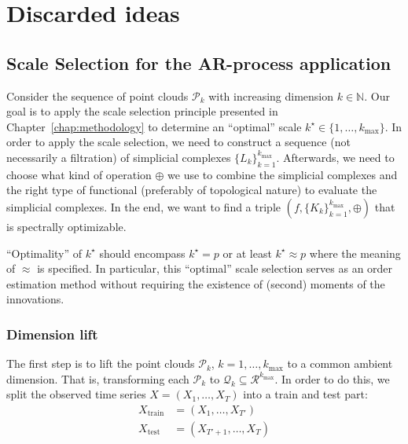 \chapter{Discarded ideas}

\section*{Scale Selection for the AR-process application}

Consider the sequence of point clouds $\mathcal{P}_k$ with increasing dimension $k\in\mathbb{N}$. Our goal is to apply the scale selection principle presented in Chapter~\ref{chap:methodology} to determine an \enquote{optimal} scale $k^{\star}\in\{1,\dots,k_{\max}\}$. In order to apply the scale selection, we need to construct a sequence (not necessarily a filtration) of simplicial complexes $\{L_k\}_{k=1}^{k_{\max}}$. Afterwards, we need to choose what kind of operation $\oplus$ we use to combine the simplicial complexes and the right type of functional (preferably of topological nature) to evaluate the simplicial complexes. In the end, we want to find a triple $(f,\{K_k\}_{k=1}^{k_{\max}},\oplus)$ that is spectrally optimizable.

\enquote{Optimality} of $k^{\star}$ should encompass $k^{\star}=p$ or at least $k^{\star}\approx p$ where the meaning of $\approx$ is specified. In particular, this \enquote{optimal} scale selection serves as an order estimation method without requiring the existence of (second) moments of the innovations.

\subsection*{Dimension lift}

The first step is to lift the point clouds $\mathcal{P}_k$, $k=1,\dots,k_{\max}$ to a common ambient dimension. That is, transforming each $\mathcal{P}_k$ to $\mathcal{Q}_k\subseteq\mathcal{R}^{k_{\max}}$. In order to do this, we split the observed time series $X=(X_1,\dots,X_T)$ into a train and test part:
\begin{align*}
    X_{\text{train}}&=(X_1,\dots,X_{T'})\\
    X_{\text{test}}&=(X_{T'+1},\dots,X_T)
\end{align*}

